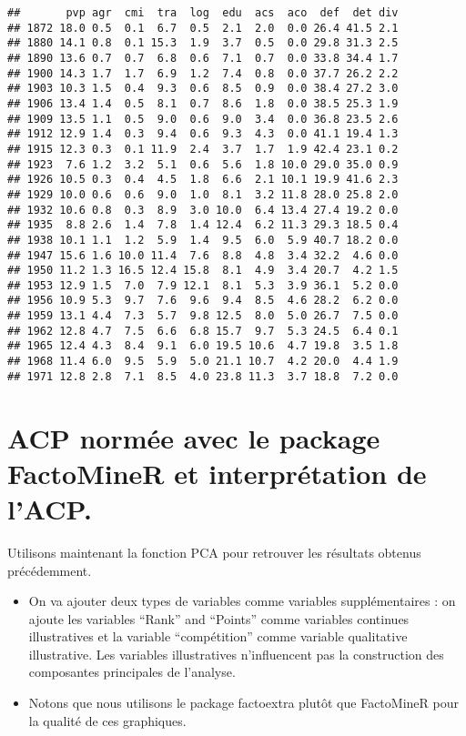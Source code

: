 \documentclass[
]{article}
\begin{document}
\begin{verbatim}
##       pvp agr  cmi  tra  log  edu  acs  aco  def  det div
## 1872 18.0 0.5  0.1  6.7  0.5  2.1  2.0  0.0 26.4 41.5 2.1
## 1880 14.1 0.8  0.1 15.3  1.9  3.7  0.5  0.0 29.8 31.3 2.5
## 1890 13.6 0.7  0.7  6.8  0.6  7.1  0.7  0.0 33.8 34.4 1.7
## 1900 14.3 1.7  1.7  6.9  1.2  7.4  0.8  0.0 37.7 26.2 2.2
## 1903 10.3 1.5  0.4  9.3  0.6  8.5  0.9  0.0 38.4 27.2 3.0
## 1906 13.4 1.4  0.5  8.1  0.7  8.6  1.8  0.0 38.5 25.3 1.9
## 1909 13.5 1.1  0.5  9.0  0.6  9.0  3.4  0.0 36.8 23.5 2.6
## 1912 12.9 1.4  0.3  9.4  0.6  9.3  4.3  0.0 41.1 19.4 1.3
## 1915 12.3 0.3  0.1 11.9  2.4  3.7  1.7  1.9 42.4 23.1 0.2
## 1923  7.6 1.2  3.2  5.1  0.6  5.6  1.8 10.0 29.0 35.0 0.9
## 1926 10.5 0.3  0.4  4.5  1.8  6.6  2.1 10.1 19.9 41.6 2.3
## 1929 10.0 0.6  0.6  9.0  1.0  8.1  3.2 11.8 28.0 25.8 2.0
## 1932 10.6 0.8  0.3  8.9  3.0 10.0  6.4 13.4 27.4 19.2 0.0
## 1935  8.8 2.6  1.4  7.8  1.4 12.4  6.2 11.3 29.3 18.5 0.4
## 1938 10.1 1.1  1.2  5.9  1.4  9.5  6.0  5.9 40.7 18.2 0.0
## 1947 15.6 1.6 10.0 11.4  7.6  8.8  4.8  3.4 32.2  4.6 0.0
## 1950 11.2 1.3 16.5 12.4 15.8  8.1  4.9  3.4 20.7  4.2 1.5
## 1953 12.9 1.5  7.0  7.9 12.1  8.1  5.3  3.9 36.1  5.2 0.0
## 1956 10.9 5.3  9.7  7.6  9.6  9.4  8.5  4.6 28.2  6.2 0.0
## 1959 13.1 4.4  7.3  5.7  9.8 12.5  8.0  5.0 26.7  7.5 0.0
## 1962 12.8 4.7  7.5  6.6  6.8 15.7  9.7  5.3 24.5  6.4 0.1
## 1965 12.4 4.3  8.4  9.1  6.0 19.5 10.6  4.7 19.8  3.5 1.8
## 1968 11.4 6.0  9.5  5.9  5.0 21.1 10.7  4.2 20.0  4.4 1.9
## 1971 12.8 2.8  7.1  8.5  4.0 23.8 11.3  3.7 18.8  7.2 0.0
\end{verbatim}

\hypertarget{acp-normuxe9e-avec-le-package-factominer-et-interpruxe9tation-de-lacp.}{%
\section{ACP normée avec le package FactoMineR et interprétation de
l'ACP.}\label{acp-normuxe9e-avec-le-package-factominer-et-interpruxe9tation-de-lacp.}}

Utilisons maintenant la fonction PCA pour retrouver les résultats
obtenus précédemment.

\begin{itemize}
\item
  On va ajouter deux types de variables comme variables supplémentaires
  : on ajoute les variables ``Rank'' and ``Points'' comme variables
  continues illustratives et la variable ``compétition'' comme variable
  qualitative illustrative. Les variables illustratives n'influencent
  pas la construction des composantes principales de l'analyse.
\item
  Notons que nous utilisons le package factoextra plutôt que FactoMineR
  pour la qualité de ces graphiques.
\end{itemize}
\end{document}
